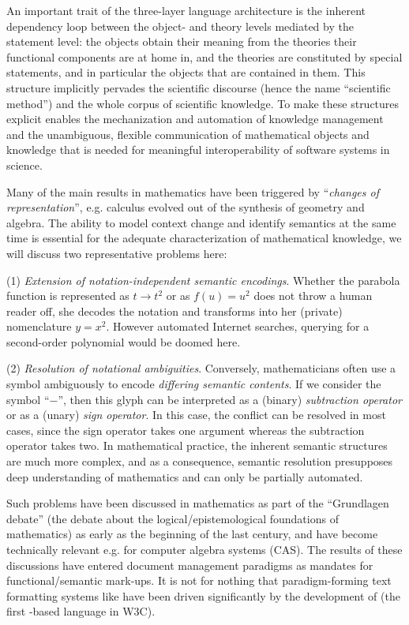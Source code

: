 \documentclass{llncs}
\def\xml{{\sc{XML}}}
\def\mathml{\sc{MathML}}
\begin{document}
An important trait of the three-layer language architecture is the inherent dependency
loop between the object- and theory levels mediated by the statement level: the objects
obtain their meaning from the theories their functional components are at home in, and the
theories are constituted by special statements, and in particular the objects that are
contained in them. This structure implicitly pervades the scientific discourse (hence the
name ``scientific method'') and the whole corpus of scientific knowledge. To make these
structures explicit enables the mechanization and automation of knowledge management
and the unambiguous, flexible communication of mathematical objects and knowledge that is
needed for meaningful interoperability of software systems in science. 


Many of the main results in mathematics have been triggered by ``{\emph{changes
    of representation}}'', e.g. calculus evolved out of the synthesis of geometry and
algebra. The ability to model context change and identify semantics at the same time is
essential for the adequate characterization of mathematical knowledge, we will discuss two
representative problems here:
  
(1) {\emph{Extension of notation-independent semantic encodings}.} Whether the parabola
function is represented as $t \rightarrow t^2$ or as $f(u)=u^2$ does not throw a human
reader off, she decodes the notation and transforms into her (private) nomenclature
$y=x^{2}$. However automated Internet searches, querying for a
second-order polynomial would be doomed here. 
  
(2) {\emph{Resolution of notational ambiguities}.} Conversely, mathematicians often use a
symbol ambiguously to encode {\emph{differing semantic contents}}. If we consider the
symbol ``$-$'', then this glyph can be interpreted as a (binary) {\emph{subtraction
    operator}} or as a (unary) {\emph{sign operator}}. In this case, the conflict can be
resolved in most cases, since the sign operator takes one argument whereas the subtraction
operator takes two. In mathematical practice, the inherent semantic structures are much
more complex, and as a consequence, semantic resolution presupposes deep understanding of 
mathematics and can only be partially automated. 

Such problems have been discussed in mathematics as part of the ``Grundlagen debate''
\cite{Giaquinto} (the debate about the logical/epistemological foundations of mathematics)
as early as the beginning of the last century, and have become technically relevant
e.g. for computer algebra systems (CAS). The results of these discussions have entered
document management paradigms as mandates for functional/semantic mark-ups. It is not for
nothing that paradigm-forming text formatting systems like {\xml} have been driven
significantly by the development of {\mathml} (the first {\xml}-based language in W3C).
\end{document}
